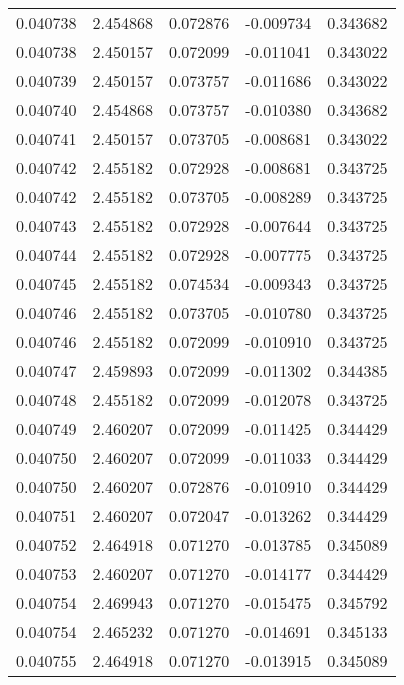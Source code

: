 \begin{tabular}{lrrrr}
0.040738    &  2.454868 &  0.072876 & -0.009734 &             0.343682 \\
0.040738    &  2.450157 &  0.072099 & -0.011041 &             0.343022 \\
0.040739    &  2.450157 &  0.073757 & -0.011686 &             0.343022 \\
0.040740    &  2.454868 &  0.073757 & -0.010380 &             0.343682 \\
0.040741    &  2.450157 &  0.073705 & -0.008681 &             0.343022 \\
0.040742    &  2.455182 &  0.072928 & -0.008681 &             0.343725 \\
0.040742    &  2.455182 &  0.073705 & -0.008289 &             0.343725 \\
0.040743    &  2.455182 &  0.072928 & -0.007644 &             0.343725 \\
0.040744    &  2.455182 &  0.072928 & -0.007775 &             0.343725 \\
0.040745    &  2.455182 &  0.074534 & -0.009343 &             0.343725 \\
0.040746    &  2.455182 &  0.073705 & -0.010780 &             0.343725 \\
0.040746    &  2.455182 &  0.072099 & -0.010910 &             0.343725 \\
0.040747    &  2.459893 &  0.072099 & -0.011302 &             0.344385 \\
0.040748    &  2.455182 &  0.072099 & -0.012078 &             0.343725 \\
0.040749    &  2.460207 &  0.072099 & -0.011425 &             0.344429 \\
0.040750    &  2.460207 &  0.072099 & -0.011033 &             0.344429 \\
0.040750    &  2.460207 &  0.072876 & -0.010910 &             0.344429 \\
0.040751    &  2.460207 &  0.072047 & -0.013262 &             0.344429 \\
0.040752    &  2.464918 &  0.071270 & -0.013785 &             0.345089 \\
0.040753    &  2.460207 &  0.071270 & -0.014177 &             0.344429 \\
0.040754    &  2.469943 &  0.071270 & -0.015475 &             0.345792 \\
0.040754    &  2.465232 &  0.071270 & -0.014691 &             0.345133 \\
0.040755    &  2.464918 &  0.071270 & -0.013915 &             0.345089 \\

\end{tabular}
